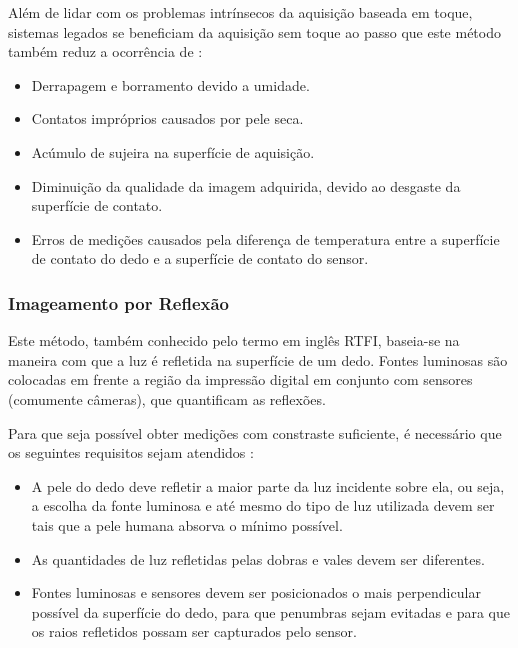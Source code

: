 Além de lidar com os problemas intrínsecos da aquisição baseada em toque, sistemas legados se beneficiam da aquisição sem toque ao passo que este método também reduz a ocorrência de \cite{advances_biometrics}:

\begin{itemize}
	\item Derrapagem e borramento devido a umidade.
	\item Contatos impróprios causados por pele seca.
	\item Acúmulo de sujeira na superfície de aquisição.
	\item Diminuição da qualidade da imagem adquirida, devido ao desgaste da superfície de contato.
	\item Erros de medições causados pela diferença de temperatura entre a superfície de contato do dedo e a superfície de contato do sensor.
\end{itemize}

\subsubsection{Imageamento por Reflexão} \label{reflection}
Este método, também conhecido pelo termo em inglês \acrfull{RTFI}, baseia-se na maneira com que a luz é refletida na superfície de um dedo. Fontes luminosas são colocadas em frente a região da impressão digital em conjunto com sensores (comumente câmeras), que quantificam as reflexões.

Para que seja possível obter medições com constraste suficiente, é necessário que os seguintes requisitos sejam atendidos \cite{advances_biometrics}:

\begin{itemize}
		\item A pele do dedo deve refletir a maior parte da luz incidente sobre ela, ou seja, a escolha da fonte luminosa e até mesmo do tipo de luz utilizada devem ser tais que a pele humana absorva o mínimo possível.
		\item As quantidades de luz refletidas pelas dobras e vales devem ser diferentes.
		\item Fontes luminosas e sensores devem ser posicionados o mais perpendicular possível da superfície do dedo, para que penumbras sejam evitadas e para que os raios refletidos possam ser capturados pelo sensor.
\end{itemize}

